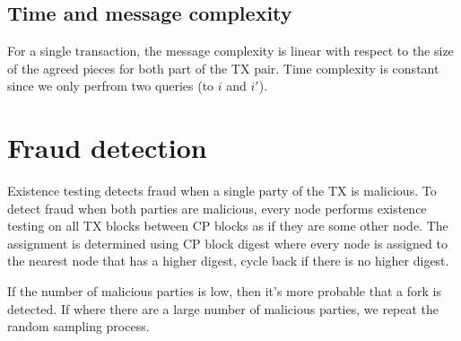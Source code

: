 \subsection{Time and message complexity}
For a single transaction, the message complexity is linear with respect to the
size of the agreed pieces for both part of the TX pair. Time complexity is
constant since we only perfrom two queries (to $i$ and $i'$).

\section{Fraud detection}
Existence testing detects fraud when a single party of the TX is malicious. To
detect fraud when both parties are malicious, every node performs existence
testing on all TX blocks between CP blocks as if they are some other node. The
assignment is determined using CP block digest where every node is assigned to
the nearest node that has a higher digest, cycle back if there is no higher
digest.

If the number of malicious parties is low, then it's more probable that a fork
is detected. If where there are a large number of malicious parties, we repeat
the random sampling process.

